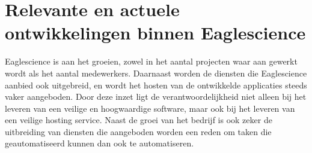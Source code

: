 \section{Relevante en actuele ontwikkelingen binnen Eaglescience}\label{sec:relevante-en-actuele-ontwikkelingen-binnen-eaglescience}
Eaglescience is aan het groeien, zowel in het aantal projecten waar aan gewerkt wordt als het aantal medewerkers. Daarnaast worden de diensten die Eaglescience aanbied ook uitgebreid, en wordt het hosten van de ontwikkelde applicaties steeds vaker aangeboden. Door deze inzet ligt de verantwoordelijkheid niet alleen bij het leveren van een veilige en hoogwaardige software, maar ook bij het leveren van een veilige hosting service. Naast de groei van het bedrijf is ook zeker de uitbreiding van diensten die aangeboden worden een reden om taken die geautomatiseerd kunnen dan ook te automatiseren.
